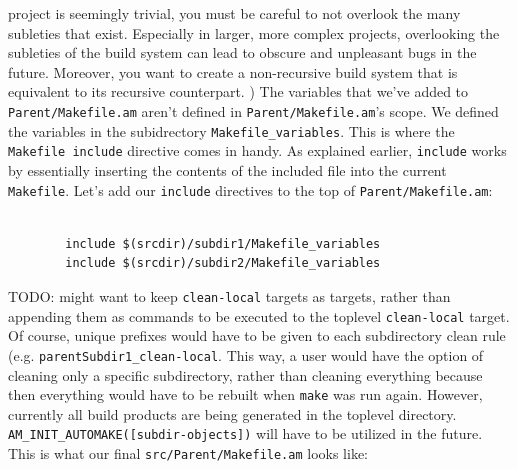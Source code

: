 project is seemingly trivial, you must be careful to not overlook the many subleties that
exist. Especially in larger, more complex projects, overlooking the subleties of the build
system can lead to obscure and unpleasant bugs in the future. Moreover, you want to create
a non-recursive build system that is equivalent to its recursive counterpart. 
\newline{}) The variables that we've added to \texttt{Parent/Makefile.am} aren't
defined in \texttt{Parent/Makefile.am}'s scope. We defined the variables in the subidrectory
\texttt{Makefile\_variables}. This is where the \texttt{Makefile include} directive
comes in handy. As explained earlier, \texttt{include} works by essentially inserting
the contents of the included file into the current \texttt{Makefile}. Let's add our
\texttt{include} directives to the top of \texttt{Parent/Makefile.am}:
    \begin{verbatim}

        include $(srcdir)/subdir1/Makefile_variables
        include $(srcdir)/subdir2/Makefile_variables
    \end{verbatim}
TODO: might want to keep \texttt{clean-local} targets as
targets, rather than appending them as commands to be executed to the toplevel \texttt{clean-local}
target. Of course, unique prefixes would have to be given to each subdirectory clean rule (e.g.
\texttt{parentSubdir1\_clean-local}. This way, a user would have the option of cleaning only
a specific subdirectory, rather than cleaning everything because then everything would have to
be rebuilt when \texttt{make} was run again. However, currently all build products are being
generated in the toplevel directory. \texttt{AM\_INIT\_AUTOMAKE([subdir-objects])} will have to be
utilized in the future.
\newline\newline
This is what our final \texttt{src/Parent/Makefile.am} looks like:
